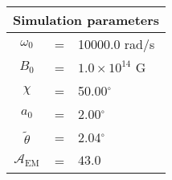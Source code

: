 \begin{tabular}{ccl}
\multicolumn{3}{c}{Simulation parameters} \\
\hline
$\omega_0$  &=& 10000.0 rad/s\\
$B_0$  &=& ${1.0}{\times} 10^{14}$ G \\
$\chi$  &=& 50.00$^{\circ}$ \\
$a_0$ &=& 2.00$^{\circ}$ \\
$\tilde{\theta}$ &= & 2.04$^{\circ}$ \\
$\mathcal{A}_{\mathrm{EM}}$ &= & $43.0$
\end{tabular}